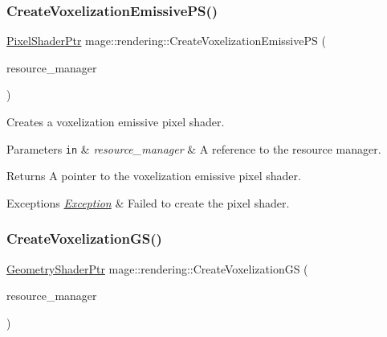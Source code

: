 \subsubsection{\texorpdfstring{Create\+Voxelization\+Emissive\+P\+S()}{CreateVoxelizationEmissivePS()}}
{\footnotesize\ttfamily \mbox{\hyperlink{namespacemage_1_1rendering_af03d922b228ee9c8542baaa2ecc9f259}{Pixel\+Shader\+Ptr}} mage\+::rendering\+::\+Create\+Voxelization\+Emissive\+PS (\begin{DoxyParamCaption}\item[{\mbox{\hyperlink{classmage_1_1rendering_1_1_resource_manager}{Resource\+Manager}} \&}]{resource\+\_\+manager }\end{DoxyParamCaption})}

Creates a voxelization emissive pixel shader.


\begin{DoxyParams}[1]{Parameters}
\mbox{\tt in}  & {\em resource\+\_\+manager} & A reference to the resource manager. \\
\hline
\end{DoxyParams}
\begin{DoxyReturn}{Returns}
A pointer to the voxelization emissive pixel shader. 
\end{DoxyReturn}

\begin{DoxyExceptions}{Exceptions}
{\em \mbox{\hyperlink{classmage_1_1_exception}{Exception}}} & Failed to create the pixel shader. \\
\hline
\end{DoxyExceptions}
\mbox{\label{namespacemage_1_1rendering_af7219f5585837c13b6b60e1d6604bca5}} 
\subsubsection{\texorpdfstring{Create\+Voxelization\+G\+S()}{CreateVoxelizationGS()}}
{\footnotesize\ttfamily \mbox{\hyperlink{namespacemage_1_1rendering_aa5d63f80f9483d0896718813768ba1cf}{Geometry\+Shader\+Ptr}} mage\+::rendering\+::\+Create\+Voxelization\+GS (\begin{DoxyParamCaption}\item[{\mbox{\hyperlink{classmage_1_1rendering_1_1_resource_manager}{Resource\+Manager}} \&}]{resource\+\_\+manager }\end{DoxyParamCaption})}


